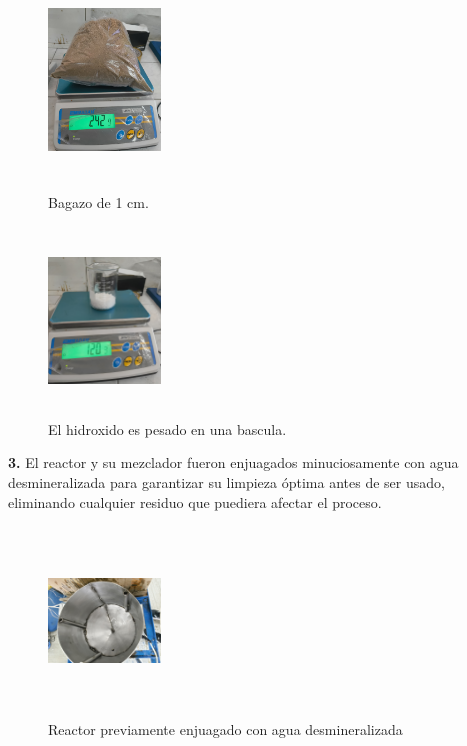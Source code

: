 \documentclass[12pt]{article}
\begin{document}
			
			\begin{figure}[H]
				\centering
				\begin{minipage}{0.46\textwidth}
					\centering
					\includegraphics[width=3cm, height=5cm]{imagenes/pesado4}
					\caption{Bagazo de 1 cm.}
					\label{bagazo1}
				\end{minipage}
				\hfill
				\begin{minipage}{0.48\textwidth}
					\centering
					\includegraphics[width=3cm, height=5cm]{imagenes/hidroxido_pesado}
					\caption{El hidroxido es pesado en una bascula.}
					\label{cernir_bagazo_hidroxidopesado}
				\end{minipage}
			\end{figure}
			
			
			
			\textbf{3.} El reactor y su mezclador fueron enjuagados minuciosamente con agua desmineralizada para garantizar su limpieza óptima antes de ser usado, eliminando cualquier residuo que puediera afectar el proceso.
			\begin{figure} [H]
				\centering
				\includegraphics[width=3cm, height=5cm,angle=90]{imagenes/reactor limpio}
				\caption{Reactor previamente enjuagado con agua desmineralizada}
				\label{reactor limpio}
			\end{figure}
			
\end{document}
